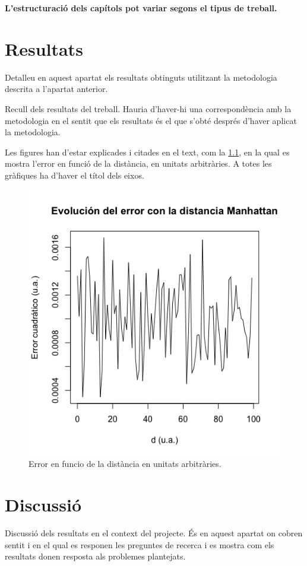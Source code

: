 \documentclass[CAT,BIB]{TFUOC}%
\begin{document}
 
\textbf{L’estructuració dels capítols pot variar segons el tipus de treball.}  
 

\chapter{Resultats}

Detalleu en aquest apartat els resultats obtinguts utilitzant la metodologia descrita a l’apartat anterior.


Recull dels resultats del treball. Hauria d'haver-hi una correspondència amb la metodologia en el sentit que els resultats és el que s'obté després d'haver aplicat la metodologia.

Les figures han d'estar explicades i citades en el text, com la \ref{fig:my_label}, en la qual es mostra l'error en funció de la distància, en unitats arbitràries. A totes les gràfiques ha d'haver el títol dels eixos.

\begin{figure}[!htbp]
    \centering
    \includegraphics[width=7truecm]{Rplotmanh.png}
    \caption{Error en funcio de la distància en unitats arbitràries.}
    \label{fig:my_label}
\end{figure}

\chapter{Discussió}
Discussió dels resultats en el context del projecte. És en aquest apartat on cobren sentit i en el qual es responen les preguntes de recerca i es mostra com els resultats donen resposta als problemes plantejats.
\end{document}

